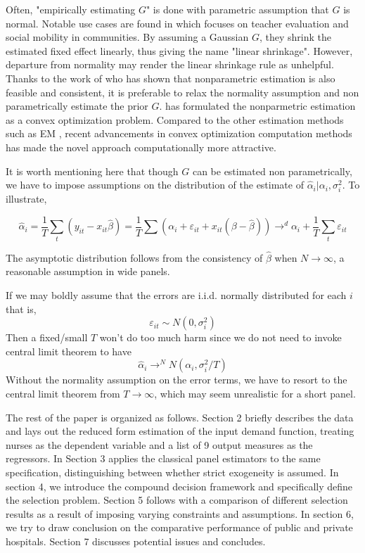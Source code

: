 \documentclass[12pt]{article}
\begin{document}
Often, "empirically estimating \(G\)" is done with parametric assumption that
\(G\) is normal. Notable use cases are found in \cite{} which focuses on
teacher evaluation and social mobility in communities. By assuming a Gaussian
$G$, they shrink the estimated fixed effect linearly, thus giving the name
"linear shrinkage". However, departure from normality may render the linear
shrinkage rule as unhelpful. Thanks to the work of \cite{} who has shown that
nonparametric estimation is also feasible and consistent, it is preferable to
relax the normality assumption and non parametrically estimate the prior $G$.
\cite{} has formulated the nonparmetric estimation as a convex optimization
problem. Compared to the other estimation methods such as EM \cite{}, recent
advancements in convex optimization computation methods \cite{} has made the
novel approach \cite{} computationally more attractive.

It is worth mentioning here that though $G$ can be estimated non
parametrically, we have to impose assumptions on the distribution of the
estimate of $\hat{\alpha}_i|\alpha_i,\sigma_i^2$. To illustrate,

$$
    \hat{\alpha}_i =\frac{1}{T}\sum_t (y_{it}-x_{it}\hat{\beta}) =\frac{1}{T}\sum(\alpha_i+\varepsilon_{it}+x_{it}(\beta-\hat{\beta})) \to^d \alpha_i+\frac{1}{T}\sum_t \varepsilon_{it}
$$

The asymptotic distribution follows from the consistency of $\hat{\beta}$ when
$N\to \infty$, a reasonable assumption in wide panels.

If we may boldly assume that the errors are i.i.d. normally distributed for
each $i$ that is, $$ \varepsilon_{it} \sim N(0, \sigma_i^2) $$ Then a
fixed/small $T$ won't do too much harm since we do not need to invoke central
limit theorem to have $$ \hat{\alpha}_i\to^N N(\alpha_i,\sigma_i^2/T) $$
Without the normality assumption on the error terms, we have to resort to the
central limit theorem from $T\to \infty$, which may seem unrealistic for a
short panel.

The rest of the paper is organized as follows. Section 2 briefly describes the
data and lays out the reduced form estimation of the input demand function,
treating nurses as the dependent variable and a list of 9 output measures as
the regressors. In Section 3 applies the classical panel estimators to the same
specification, distinguishing between whether strict exogeneity is assumed. In
section 4, we introduce the compound decision framework and specifically define
the selection problem. Section 5 follows with a comparison of different
selection results as a result of imposing varying constraints and assumptions.
In section 6, we try to draw conclusion on the comparative performance of
public and private hospitals. Section 7 discusses potential issues and
concludes.
\end{document}
